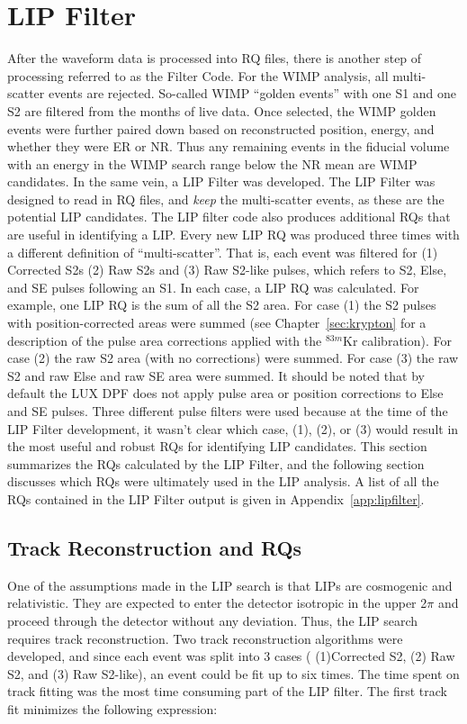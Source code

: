 \section{LIP Filter}
\label{sec:lip_filter}
After the waveform data is processed into \ac{RQ} files, there is another step of processing referred to as the Filter Code. For the \ac{WIMP} analysis, all multi-scatter events are rejected. So-called \ac{WIMP} ``golden events'' with one S1 and one S2 are filtered from the months of live data. Once selected, the \ac{WIMP} golden events were further paired down based on reconstructed position, energy, and whether they were \ac{ER} or \ac{NR}. Thus any remaining events in the fiducial volume with an energy in the \ac{WIMP} search range below the \ac{NR} mean are \ac{WIMP} candidates. In the same vein, a \ac{LIP} Filter was developed. The \ac{LIP} Filter was designed to read in \ac{RQ} files, and \textit{keep} the multi-scatter events, as these are the potential \ac{LIP} candidates. The \ac{LIP} filter code also produces additional \ac{RQ}s that are useful in identifying a \ac{LIP}. Every new \ac{LIP} \ac{RQ} was produced three times with a different definition of ``multi-scatter''. That is, each event was filtered for (1) Corrected S2s (2) Raw S2s and (3) Raw S2-like pulses, which refers to S2, Else, and SE pulses following an S1. In each case, a \ac{LIP} \ac{RQ} was calculated. For example, one \ac{LIP} \ac{RQ} is the sum of all the S2 area. For case (1) the S2 pulses with position-corrected areas were summed (see Chapter~\ref{sec:krypton} for a description of the pulse area corrections applied with the $^{83m}$Kr calibration). For case (2) the raw S2 area (with no corrections) were summed. For case (3) the raw S2 and raw Else and raw SE area were summed. It should be noted that by default the \ac{LUX} \ac{DPF} does not apply pulse area or position corrections to Else and SE pulses. Three different pulse filters were used because at the time of the \ac{LIP} Filter development, it wasn't clear which case, (1), (2), or (3) would result in the most useful and robust \ac{RQ}s for identifying \ac{LIP} candidates. This section summarizes the \ac{RQ}s calculated by the \ac{LIP} Filter, and the following section discusses which \ac{RQ}s were ultimately used in the \ac{LIP} analysis. A list of all the \ac{RQ}s contained in the \ac{LIP} Filter output is given in Appendix~\ref{app:lipfilter}. 

\subsection{Track Reconstruction and RQs}
One of the assumptions made in the \ac{LIP} search is that \ac{LIP}s are cosmogenic and relativistic. They are expected to enter the detector isotropic in the upper 2$\pi$ and proceed through the detector without any deviation. Thus, the \ac{LIP} search requires track reconstruction. Two track reconstruction algorithms were developed, and since each event was split into 3 cases ( (1)Corrected S2, (2) Raw S2, and (3) Raw S2-like), an event could be fit up to six times. The time spent on track fitting was the most time consuming part of the \ac{LIP} filter. The first track fit minimizes the following expression:

